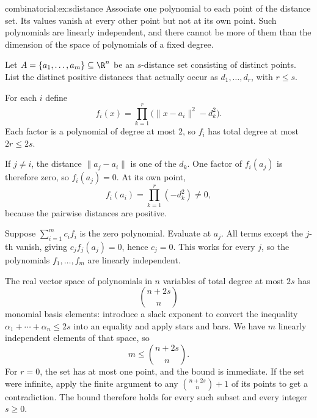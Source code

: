 \begin{solution}{combinatorial:ex:sdistance}
\idea Associate one polynomial to each point of the distance set. Its values vanish at every other point but not at its own point. Such polynomials are linearly independent, and there cannot be more of them than the dimension of the space of polynomials of a fixed degree.

\writeup Let $A=\{a_1,\ldots,a_m\}\subseteq\R^n$ be an $s$-distance set consisting of distinct points. List the distinct positive distances that actually occur as $d_1,\ldots,d_r$, with $r\le s$.

For each $i$ define
\[
f_i(x)=\prod_{k=1}^r\bigl(\|x-a_i\|^2-d_k^2\bigr).
\]
Each factor is a polynomial of degree at most $2$, so $f_i$ has total degree at most $2r\le2s$.

If $j\ne i$, the distance $\|a_j-a_i\|$ is one of the $d_k$. One factor of $f_i(a_j)$ is therefore zero, so $f_i(a_j)=0$. At its own point,
\[
f_i(a_i)=\prod_{k=1}^r(-d_k^2)\ne0,
\]
because the pairwise distances are positive.

Suppose $\sum_{i=1}^m c_if_i$ is the zero polynomial. Evaluate at $a_j$. All terms except the $j$-th vanish, giving $c_jf_j(a_j)=0$, hence $c_j=0$. This works for every $j$, so the polynomials $f_1,\ldots,f_m$ are linearly independent.

The real vector space of polynomials in $n$ variables of total degree at most $2s$ has
\[
\binom{n+2s}{n}
\]
monomial basis elements: introduce a slack exponent to convert the inequality $\alpha_1+\cdots+\alpha_n\le2s$ into an equality and apply stars and bars. We have $m$ linearly independent elements of that space, so
\[
\boxed{m\le\binom{n+2s}{n}}.
\]
For $r=0$, the set has at most one point, and the bound is immediate.
If the set were infinite, apply the finite argument to any
$\binom{n+2s}{n}+1$ of its points to get a contradiction.
The bound therefore holds for every such subset and every integer $s\ge0$.
\end{solution}

